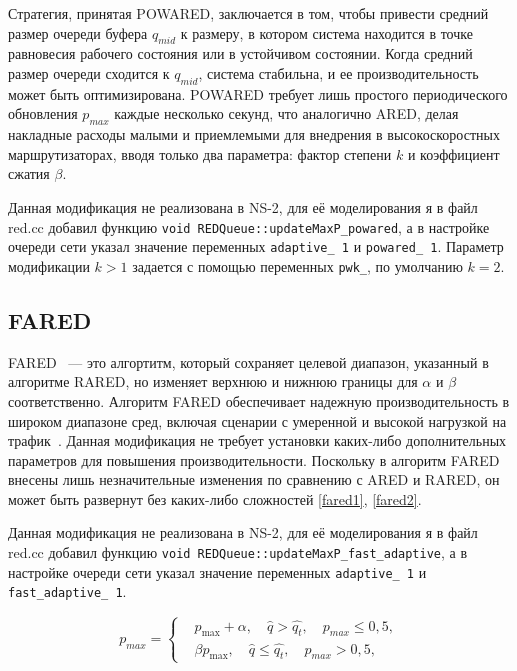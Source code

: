 Стратегия, принятая POWARED, заключается в том, чтобы привести средний размер очереди буфера $q_{mid}$ к размеру, 
в котором система находится в точке равновесия рабочего состояния или в устойчивом состоянии.
Когда средний размер очереди сходится к $q_{mid}$, система стабильна, и ее производительность может быть оптимизирована.
POWARED требует лишь простого периодического обновления $p_{max}$ каждые несколько секунд, что аналогично ARED, 
делая накладные расходы малыми и приемлемыми для внедрения в высокоскоростных маршрутизаторах, вводя только два параметра:
фактор степени $k$ и коэффициент сжатия $\beta$.


Данная модификация не реализована в NS-2, для её моделирования я в файл red.cc добавил функцию 
\verb|void REDQueue::updateMaxP_powared|, а в настройке очереди сети указал значение переменных 
\verb|adaptive_ 1| и \verb|powared_ 1|. 
Параметр модификации $k>1$ задается с помощью переменных \verb|pwk_|, по умолчанию $k=2$.



\subsection{FARED}

FARED ~--- это алгортитм, который сохраняет целевой диапазон, указанный в алгоритме RARED, 
но изменяет верхнюю и нижнюю границы для $\alpha $ и $\beta$ соответственно. 
Алгоритм FARED обеспечивает надежную производительность в широком диапазоне сред, 
включая сценарии с умеренной и высокой нагрузкой на трафик~\cite{Tahiliani2012}.
Данная модификация не требует установки каких-либо дополнительных параметров для повышения 
производительности. Поскольку в алгоритм FARED внесены лишь незначительные изменения по сравнению
с ARED и RARED, он может быть развернут без каких-либо сложностей \eqref{fared1}, \eqref{fared2}.


Данная модификация не реализована в NS-2, для её моделирования я в файл red.cc добавил функцию 
\verb|void REDQueue::updateMaxP_fast_adaptive|, а в настройке очереди сети указал значение переменных 
\verb|adaptive_ 1| и \verb|fast_adaptive_ 1|. 

\begin{equation}
\label{fared1}
p_{max} = \left\{
  \begin{aligned}
& p_{\max}+\alpha, \quad  \hat{q}>\hat{q_{t}}, \quad p_{max} \leqslant 0,5, \\
& \beta p_{\max}, \quad \hat{q}\leqslant\hat{q_{t}}, \quad p_{max} > 0,5,
  \end{aligned}
\right.
\end{equation}

